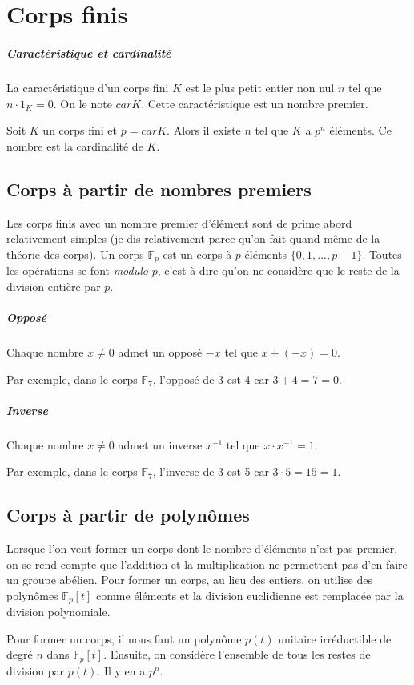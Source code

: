 \documentclass[10pt,a4paper]{book}
\newcommand{\F}{\mathbb{F}}
\begin{document}
\chapter{Corps finis}
\paragraph{Caractéristique et cardinalité}
La caractéristique d'un corps fini $K$ est le plus petit entier non nul $n$ tel que $n\cdot 1_K = 0$. On le note $carK$. Cette caractéristique est un nombre premier.\par 
Soit $K$ un corps fini et $p=carK$. Alors il existe $n$ tel que $K$ a $p^n$ éléments. Ce nombre est la cardinalité de $K$.

\section{Corps à partir de nombres premiers}
Les corps finis avec un nombre premier d'élément sont de prime abord relativement simples (je dis relativement parce qu'on fait quand même de la théorie des corps). Un corps $\F_p$ est un corps à $p$ éléments $\{0,1,...,p-1\}$. Toutes les opérations se font \textit{modulo} $p$, c'est à dire qu'on ne considère que le reste de la division entière par $p$.

\paragraph{Opposé}
Chaque nombre $x\neq 0$ admet un opposé $-x$ tel que $x+(-x)=0$.\par
Par exemple, dans le corps $\F_7$, l'opposé de 3 est 4 car $3+4=7=0$.

\paragraph{Inverse}
Chaque nombre $x\neq 0$ admet un inverse $x^{-1}$ tel que $x\cdot x^{-1}=1$.\par
Par exemple, dans le corps $\F_7$, l'inverse de 3 est 5 car $3\cdot 5=15=1$.

\section{Corps à partir de polynômes}
Lorsque l'on veut former un corps dont le nombre d'éléments n'est pas premier, on se rend compte que l'addition et la multiplication ne permettent pas d'en faire un groupe abélien. Pour former un corps, au lieu des entiers, on utilise des polynômes $\F_p[t]$ comme éléments et la division euclidienne est remplacée par la division polynomiale.\par 
Pour former un corps, il nous faut un polynôme $p(t)$ unitaire irréductible de degré $n$ dans $\F_p[t]$. Ensuite, on considère l'ensemble de tous les restes de division par $p(t)$. Il y en a $p^n$.
\end{document}
